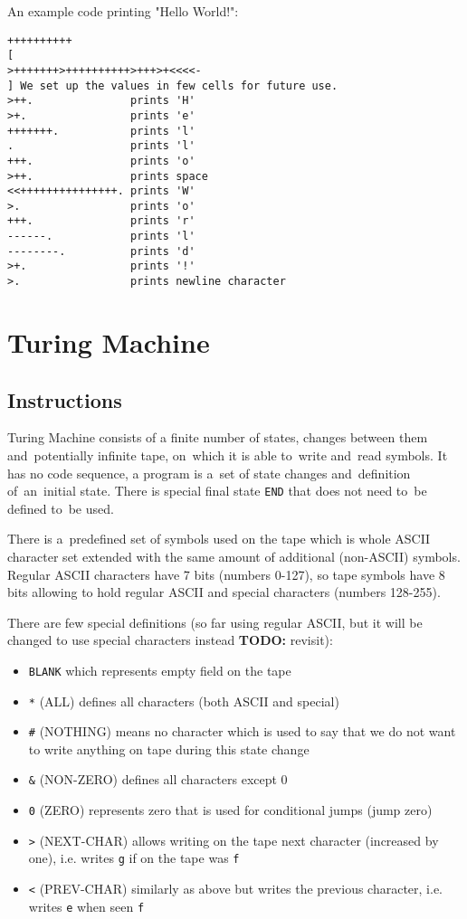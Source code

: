 \documentclass[english,shortabstract,mgr]{iithesis}
\newcommand{\todo}[1]{\textbf{TODO:} #1}
\begin{document}
An example code printing "Hello World!":
\begin{verbatim}
++++++++++
[
>+++++++>++++++++++>+++>+<<<<-
] We set up the values in few cells for future use.
>++.               prints 'H'
>+.                prints 'e'
+++++++.           prints 'l'
.                  prints 'l'
+++.               prints 'o'
>++.               prints space
<<+++++++++++++++. prints 'W'
>.                 prints 'o'
+++.               prints 'r'
------.            prints 'l'
--------.          prints 'd'
>+.                prints '!'
>.                 prints newline character
\end{verbatim}

\section {Turing Machine}

\subsection {Instructions}

Turing Machine consists of a finite number of states, changes between them
and~potentially infinite tape, on~which it is able to~write and~read symbols.
It has no code sequence, a program is a~set of state changes and~definition
of~an~initial state. There is special final state \texttt{END} that does not need
        to~be defined to~be used.

There is a~predefined set of symbols used on the tape which is whole ASCII character set
extended with the same amount of additional (non-ASCII) symbols. Regular
ASCII characters have 7 bits (numbers 0-127), so tape symbols have 8 bits
allowing to hold regular ASCII and special characters (numbers 128-255).

        There are few special definitions (so far using regular ASCII,
but it will be changed to use special characters instead \todo{revisit}):
\begin{itemize}
  \item \texttt{BLANK} which represents empty field on the tape
  \item \texttt{*} (ALL) defines all characters (both ASCII and special)
  \item \texttt{\#} (NOTHING) means no character which is used to say
                   that we do not want to write anything on tape during
                   this state change
          \item \texttt{\&} (NON-ZERO) defines all characters except 0
          \item \texttt{0} (ZERO) represents zero that is used for conditional jumps
           (jump zero)
          \item \texttt{>} (NEXT-CHAR) allows writing on the tape next character
                   (increased by one), i.e. writes \texttt{g} if on the tape
                   was \texttt{f}
  \item \texttt{<} (PREV-CHAR) similarly as above but writes the previous character,
                   i.e. writes \texttt{e} when seen \texttt{f}
\end{itemize}
\end{document}
